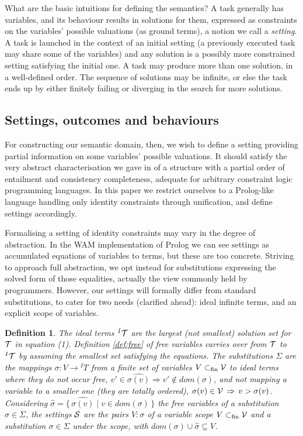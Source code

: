 \documentclass{tlp}
\def\around#1#2{#1#2#1}
\def\set#1#2{\{\,#1\;|\;#2\,\}}
\def\subfin{_{\mathrm{fin}}}
\def\fsubset{\subset\subfin}
\newcommand{\dom}[1]{\mathit{dom}(#1)}
\def\imp{\rightarrow}
\def\Imp{\Rightarrow}
\def\sImp{\around\,\Imp}
\def\S{{\cal S}}               \def\T{{\cal T}}               \def\V{{\cal V}}               \def\dlt{\triangle}
\newtheorem{definition}[theorem]{Definition}
\def\Ss{\Sigma}
\def\s{\sigma}
\def\fss{\fsubset}
\def\fv#1{\widehat{#1}}
\def\stng#1#2{#1\!\!:\!#2}
\begin{document}
What are the basic intuitions for defining the semantics? A task generally has
variables, and its behaviour results in solutions for them, expressed
as constraints on the variables' possible valuations (as ground terms), a notion we
call a \emph{setting}. A task is launched in the context of an initial setting
(a previously executed task may share some of the variables) and
any solution is a  possibly more constrained setting satisfying the initial one. A
task may produce more than one solution, in a well-defined order. The sequence of
solutions may be infinite, or else the task ends up by either finitely failing or
diverging in the search for more solutions.

\subsection{Settings, outcomes and behaviours}

For constructing our semantic domain, then, we wish to define a
setting providing partial information on some variables' possible
valuations. It should satisfy the very abstract characterisation we gave in
\cite{mo_po:98:ebac} of a structure with a partial order of entailment and
consistency completeness, adequate for arbitrary constraint logic
programming languages. In this paper we restrict ourselves to a Prolog-like
language handling only identity constraints through unification, and define
settings accordingly.

Formalising a setting of identity constraints may vary in the degree of
abstraction. In the WAM \cite{ai-ka:91:wamtr} implementation of Prolog we can see
settings as accumulated equations of variables to terms, but these are too
concrete. Striving to approach full abstraction, we opt instead for substitutions
expressing the solved form of those equalities, actually the view commonly held
by programmers. However, our settings will formally differ from standard
substitutions, to cater for two needs (clarified ahead): ideal infinite terms, and an
explicit scope of variables.

\begin{definition}
  The \emph{ideal terms} $^I\T$ are the largest (not smallest) solution set for
  $\T$ in equation (1). Definition \ref{def:free} of free variables carries
  over from $\T$ to $^I\T$ by assuming the smallest set satisfying the equations.
  The \emph{substitutions} $\Ss$ are the mappings $\s:V\imp{}^IT$ from a finite
  set of variables $V\fss\V$ to ideal terms where they do not occur free,
  $v'\in\fv{\s(v)}\Imp v'\not\in\dom\s$, and not mapping a variable to a smaller
  one (they are totally ordered),  $\s(v)\in\V\sImp
  v>\s(v)$. Considering $\fv\s=\set{\fv{\s(v)}}{v\in\dom\s}$ the free variables
  of a substitution $\s\in\Ss$, the \emph{settings} $\S$ are the pairs $\stng
  V\s$ of a variable \emph{scope} $V\fss\V$ and a substitution $\s\in\Ss$ under
  the scope, with $\dom\s\cup\fv\s\subseteq V$.
\end{definition}
\end{document}
